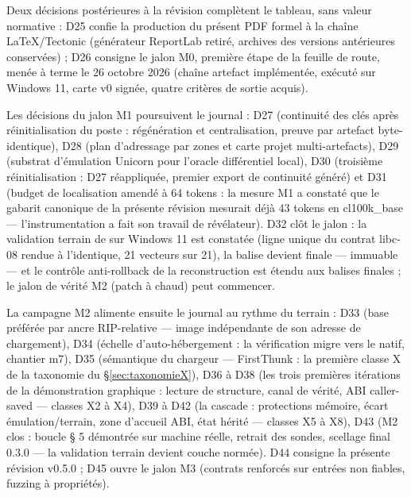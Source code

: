 Deux décisions postérieures à la révision complètent le tableau, sans valeur
normative : D25 confie la production du présent PDF formel à la chaîne
LaTeX/Tectonic (générateur ReportLab retiré, archives des versions antérieures
conservées) ; D26 consigne le jalon M0, première étape de la feuille de route,
menée à terme le 26 octobre 2026 (chaîne artefact implémentée, 
exécuté sur Windows 11, carte v0 signée, quatre critères de sortie acquis).

Les décisions du jalon M1 poursuivent le journal : D27 (continuité des clés après
réinitialisation du poste : régénération et centralisation, preuve par artefact
byte-identique), D28 (plan d'adressage par zones et carte projet multi-artefacts),
D29 (substrat d'émulation Unicorn pour l'oracle différentiel local), D30 (troisième
réinitialisation : D27 réappliquée, premier export de continuité généré) et D31
(budget de localisation amendé à 64 tokens : la mesure M1 a constaté que le gabarit
canonique de la présente révision mesurait déjà 43 tokens en cl100k\_base —
l'instrumentation a fait son travail de révélateur). D32 clôt le jalon : la
validation terrain de  sur Windows 11 est constatée (ligne unique
du contrat libc-08 rendue à l'identique, 21 vecteurs sur 21), la balise devient
 finale — immuable — et le contrôle anti-rollback de la reconstruction
est étendu aux balises finales ; le jalon de vérité M2 (patch à chaud) peut
commencer.

La campagne M2 alimente ensuite le journal au rythme du terrain : D33 (base préférée
par ancre RIP-relative — image indépendante de son adresse de chargement), D34
(échelle d’auto-hébergement : la vérification migre vers le natif, chantier m7), D35
(sémantique du chargeur — FirstThunk : la première classe X de la taxonomie du
§\ref{sec:taxonomieX}), D36 à D38 (les trois premières itérations de la démonstration
graphique : lecture de structure, canal de vérité, ABI caller-saved — classes X2 à X4),
D39 à D42 (la cascade : protections mémoire, écart émulation/terrain, zone d’accueil
ABI, état hérité — classes X5 à X8), D43 (M2 clos : boucle § 5 démontrée sur machine
réelle, retrait des sondes, scellage final 0.3.0 — la validation terrain devient
couche normée). D44 consigne la présente révision v0.5.0 ; D45 ouvre le jalon M3
(contrats renforcés sur entrées non fiables, fuzzing à propriétés).

